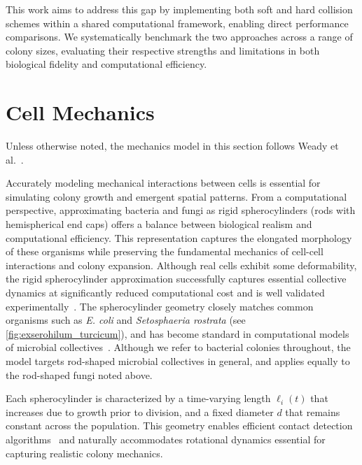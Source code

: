 \documentclass[a4paper,fleqn]{cas-dc}
\begin{document}
This work aims to address this gap by implementing both soft and hard collision schemes within a shared computational framework, enabling direct performance comparisons. We systematically benchmark the two approaches across a range of colony sizes, evaluating their respective strengths and limitations in both biological fidelity and computational efficiency.

\section{Cell Mechanics}

Unless otherwise noted, the mechanics model in this section follows Weady et al.~\cite{Weady2024,Weady2024SM}.

Accurately modeling mechanical interactions between cells is essential for simulating colony growth and emergent spatial patterns. From a computational perspective, approximating bacteria and fungi as rigid spherocylinders (rods with hemispherical end caps) offers a balance between biological realism and computational efficiency. This representation captures the elongated morphology of these organisms while preserving the fundamental mechanics of cell-cell interactions and colony expansion. Although real cells exhibit some deformability, the rigid spherocylinder approximation successfully captures essential collective dynamics at significantly reduced computational cost and is well validated experimentally~\cite{Rudge2012,Khan_2024,Rudge2013,Langeslay_2023,Ghosh2015}. The spherocylinder geometry closely matches common organisms such as \textit{E. coli} and \textit{Setosphaeria rostrata} (see \autoref{fig:exserohilum_turcicum}), and has become standard in computational models of microbial collectives~\cite{You2018, Weady2024, Blanchard2015, Warren2019, Ghosh2015}. Although we refer to bacterial colonies throughout, the model targets rod-shaped microbial collectives in general, and applies equally to the rod-shaped fungi noted above.

Each spherocylinder is characterized by a time-varying length $\ell_i(t)$ that increases due to growth prior to division, and a fixed diameter $d$ that remains constant across the population. This geometry enables efficient contact detection algorithms~\cite{GeometricTools} and naturally accommodates rotational dynamics essential for capturing realistic colony mechanics.
\end{document}
